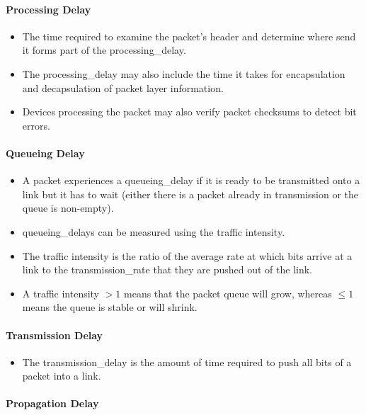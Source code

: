 \documentclass{article}
\begin{document}
\paragraph{Processing Delay}

\begin{itemize}
    \item The time required to examine the packet's header and determine where send it forms part of the \gls{processing_delay}.
    \item The \gls*{processing_delay} may also include the time it takes for encapsulation and decapsulation of packet layer information.
    \item Devices processing the packet may also verify packet checksums to detect bit errors.
\end{itemize}

\paragraph{Queueing Delay}

\begin{itemize}
    \item A packet experiences a \gls{queueing_delay} if it is ready to be transmitted onto a link but it has to wait (either there is a packet already in transmission or the queue is non-empty).
    \item \Glspl*{queueing_delay} can be measured using the traffic intensity.
    \item The traffic intensity is the ratio of the average rate at which bits arrive at a link to the \gls*{transmission_rate} that they are pushed out of the link.
    \item A traffic intensity $> 1$ means that the packet queue will grow, whereas $\leq 1$ means the queue is stable or will shrink.
\end{itemize}

\paragraph{Transmission Delay}

\begin{itemize}
    \item The \gls{transmission_delay} is the amount of time required to push all bits of a packet into a link.
\end{itemize} 

\paragraph{Propagation Delay}
\end{document}
